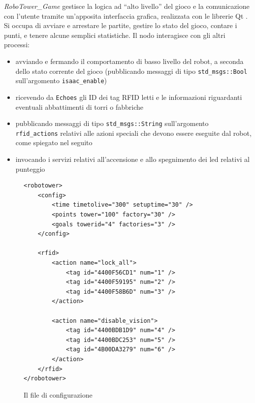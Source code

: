 \emph{RoboTower\_Game} gestisce la logica ad ``alto livello'' del gioco e la comunicazione con l'utente tramite un'apposita interfaccia grafica, realizzata con le librerie Qt \cite{qtweb}. Si occupa di avviare e arrestare le partite, gestire lo stato del gioco, contare i punti, e tenere alcune semplici statistiche. Il nodo interagisce con gli altri processi:
\begin{itemize}
\item avviando e fermando il comportamento di basso livello del robot, a seconda dello stato corrente del gioco (pubblicando messaggi di tipo \verb|std_msgs::Bool| sull'argomento \verb|isaac_enable|)
\item ricevendo da \verb|Echoes| gli ID dei tag RFID letti e le informazioni riguardanti eventuali abbattimenti di torri o fabbriche
\item pubblicando messaggi di tipo \verb|std_msgs::String| sull'argomento \verb|rfid_actions| relativi alle azioni speciali che devono essere eseguite dal robot, come spiegato nel seguito
\item invocando i servizi relativi all'accensione e allo spegnimento dei led relativi al punteggio
\end{itemize}

\begin{figure}[h]
{
\begin{lstlisting}
<robotower>
	<config>
		<time timetolive="300" setuptime="30" />
		<points tower="100" factory="30" />
		<goals towerid="4" factories="3" />
	</config>

	<rfid>
		<action name="lock_all">
			<tag id="4400F56CD1" num="1" />
			<tag id="4400F59195" num="2" />
			<tag id="4400F58B6D" num="3" />
		</action>
      
		<action name="disable_vision">
			<tag id="4400BDB1D9" num="4" />
			<tag id="4400BDC253" num="5" />
			<tag id="4B00DA3279" num="6" />
		</action>
	</rfid>
</robotower>
\end{lstlisting}
}
\caption{Il file di configurazione}
\label{fig:configfile}
\end{figure}

